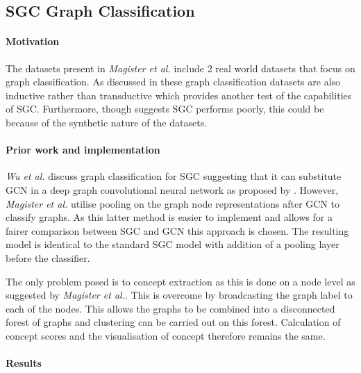\subsection{SGC Graph Classification}
\paragraph{Motivation}
The datasets present in \textit{Magister et al.}\cite{magister2021gcexplainer} include 2 real world datasets that focus on graph classification.
As discussed in  these graph classification datasets are also inductive rather than transductive which provides another test of the capabilities of SGC.
Furthermore, though  suggests SGC performs poorly, this could be because of the synthetic nature of the datasets.

\paragraph{Prior work and implementation}
\textit{Wu et al.}\cite{wu2019simplifying} discuss graph classification for SGC suggesting that it can substitute GCN in a deep graph convolutional neural network as proposed by .
However, \textit{Magister et al.} utilise pooling on the graph node representations after GCN to classify graphs. As this latter method is easier to implement and allows for a fairer comparison between SGC and GCN this approach is chosen.
The resulting model is identical to the standard SGC model with addition of a pooling layer before the classifier.

The only problem posed is to concept extraction as this is done on a node level as suggested by \textit{Magister et al.}.
This is overcome by broadcasting the graph label to each of the nodes.
This allows the graphs to be combined into a disconnected forest of graphs and clustering can be carried out on this forest.
Calculation of concept scores and the visualisation of concept therefore remains the same.

\paragraph{Results}

